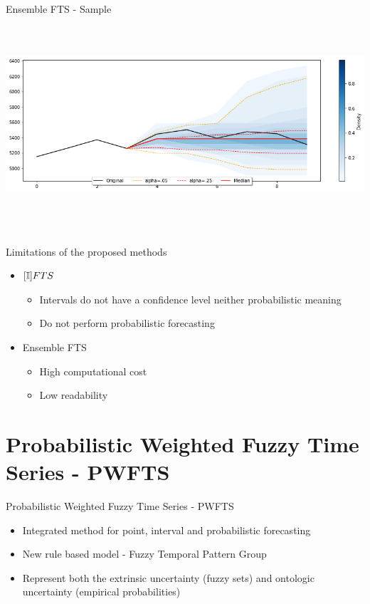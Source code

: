 \documentclass{beamer}
\begin{document}
\begin{frame}{Ensemble FTS - Sample}
\includegraphics[width=\textwidth,height=8cm]{figures/ensemblefts_sample_manystep.png}
\end{frame}

\note[itemize]{
\item 
}

\begin{frame}{Limitations of the proposed methods}
\linespread{2}
\begin{itemize}
\item $[\mathbb{I}]FTS$
\begin{itemize}
\item Intervals do not have a confidence level neither probabilistic meaning
\item Do not perform probabilistic forecasting
\end{itemize}
\item Ensemble FTS
\begin{itemize}
\item High computational cost
\item Low readability 
\end{itemize}
\end{itemize}
\end{frame}

\section{Probabilistic Weighted Fuzzy Time Series - PWFTS}

\begin{frame}{Probabilistic Weighted Fuzzy Time Series - PWFTS}
\linespread{2}
\begin{itemize} 
    \item Integrated method for point, interval and probabilistic forecasting
    \item New rule based model - Fuzzy Temporal Pattern Group 
    \item Represent both the extrinsic uncertainty (fuzzy sets) and ontologic uncertainty (empirical probabilities)
\end{itemize}
\end{frame}
\end{document}
